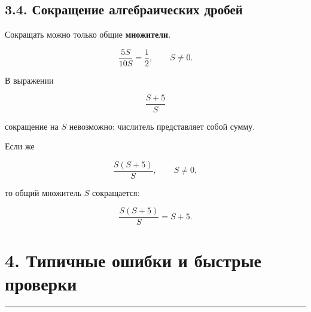 \documentclass[a4paper,12pt]{article}
\newcommand{\sectionline}{%
  \vspace{0.15em}%
  \noindent\textcolor{accent}{\rule{\linewidth}{0.6pt}}%
  \vspace{0.3em}%
}
\begin{document}
\subsection*{3.4. Сокращение алгебраических дробей}

Сокращать можно только общие \textbf{множители}.

\[
\frac{5S}{10S}=\frac12,
\qquad S\ne0.
\]

В выражении

\[
\frac{S+5}{S}
\]

сокращение на $S$ невозможно: числитель представляет собой сумму.

Если же

\[
\frac{S(S+5)}{S},
\qquad S\ne0,
\]

то общий множитель $S$ сокращается:

\[
\frac{S(S+5)}{S}=S+5.
\]


\section*{4. Типичные ошибки и быстрые проверки}
\sectionline
\end{document}
